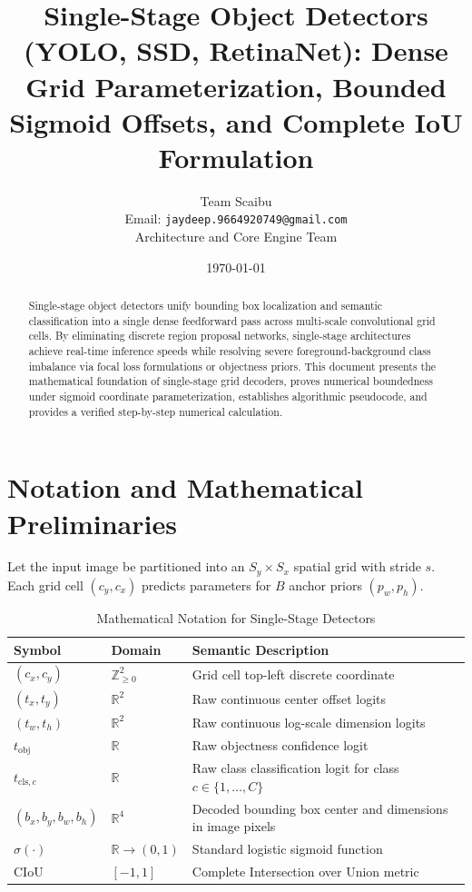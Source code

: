 \documentclass[11pt,a4paper]{article}
\title{Single-Stage Object Detectors (YOLO, SSD, RetinaNet): Dense Grid Parameterization, Bounded Sigmoid Offsets, and Complete IoU Formulation}
\author{Team Scaibu \\ \small Email: \texttt{jaydeep.9664920749@gmail.com} \\ \small Architecture and Core Engine Team}
\date{\today}
\theoremstyle{definition}
\begin{document}
\maketitle

\begin{abstract}
Single-stage object detectors unify bounding box localization and semantic classification into a single dense feedforward pass across multi-scale convolutional grid cells. By eliminating discrete region proposal networks, single-stage architectures achieve real-time inference speeds while resolving severe foreground-background class imbalance via focal loss formulations or objectness priors. This document presents the mathematical foundation of single-stage grid decoders, proves numerical boundedness under sigmoid coordinate parameterization, establishes algorithmic pseudocode, and provides a verified step-by-step numerical calculation.
\end{abstract}

\section{Notation and Mathematical Preliminaries}

Let the input image be partitioned into an $S_y \times S_x$ spatial grid with stride $s$. Each grid cell $(c_y, c_x)$ predicts parameters for $B$ anchor priors $(p_w, p_h)$.

\begin{table}[h]
\centering
\caption{Mathematical Notation for Single-Stage Detectors}
\begin{tabular}{lll}
\toprule
\textbf{Symbol} & \textbf{Domain} & \textbf{Semantic Description} \\
\midrule
$(c_x, c_y)$ & $\mathbb{Z}_{\ge 0}^2$ & Grid cell top-left discrete coordinate \\
$(t_x, t_y)$ & $\mathbb{R}^2$ & Raw continuous center offset logits \\
$(t_w, t_h)$ & $\mathbb{R}^2$ & Raw continuous log-scale dimension logits \\
$t_{\text{obj}}$ & $\mathbb{R}$ & Raw objectness confidence logit \\
$t_{\text{cls}, c}$ & $\mathbb{R}$ & Raw class classification logit for class $c \in \{1,\dots, C\}$ \\
$(b_x, b_y, b_w, b_h)$ & $\mathbb{R}^4$ & Decoded bounding box center and dimensions in image pixels \\
$\sigma(\cdot)$ & $\mathbb{R} \to (0, 1)$ & Standard logistic sigmoid function \\
$\text{CIoU}$ & $[-1, 1]$ & Complete Intersection over Union metric \\
\bottomrule
\end{tabular}
\end{table}
\end{document}
